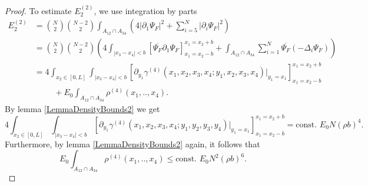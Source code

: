 \documentclass[a4paper,11pt]{article}
\newcommand{\abs}[1]{\left\lvert #1 \right\rvert}
\numberwithin{equation}{section}
\begin{document}
\begin{proof}
		To estimate $ E_2^{(2)} $, we use integration by parts\begin{equation}
		\begin{aligned}
		E_2^{(2)}&=\binom{N}{2}\binom{N-2}{2}\int_{A_{12}\cap A_{34}} \left(4\abs{\partial_1\Psi_F}^2+\sum_{i=5}^{N}\abs{\partial_i\Psi_F}^2\right)\\
		&=\binom{N}{2}\binom{N-2}{2}\left(4\int_{\abs{x_3-x_4}<b}\left[\overline{\Psi_F}\partial_1\Psi_F\right]_{x_1=x_2-b}^{x_1=x_2+b} +\int_{A_{12}\cap A_{34}} \sum_{i=1}^{N}\overline{\Psi_F}(-\Delta_i\Psi_F)\right)\\
		&=4\int_{x_2\in[0,L]}\int_{\abs{x_3-x_4}<b}\left[\partial_{y_1}\gamma^{(4)}(x_1,x_2,x_3,x_4;y_1,x_2,x_3,x_4)\bigg\vert_{y_1=x_1}\right]_{x_1=x_2-b}^{x_1=x_2+b}\\&\hspace{1cm}+E_0\int_{A_{12}\cap A_{34}}\rho^{(4)}(x_1,..,x_4).
		\end{aligned}
		\end{equation}
		By lemma \ref{LemmaDensityBounds2} we get \begin{equation}
		4\int_{x_2\in[0,L]}\int_{\abs{x_3-x_4}<b}\left[\partial_{y_1}\gamma^{(4)}(x_1,x_2,x_3,x_4;y_1,y_2,y_3,y_4)\bigg\vert_{y_1=x_1}\right]_{x_1=x_2-b}^{x_1=x_2+b}=\text{const. }E_0 N (\rho b)^4.
		\end{equation}
		Furthermore, by lemma \ref{LemmaDensityBounds2} again, it follows that \begin{equation}
		E_0\int_{A_{12}\cap A_{34}}\rho^{(4)}(x_1,..,x_4)\leq \text{const. } E_0 N^2(\rho b)^6.
		\end{equation}
	\end{proof}
		
\end{document}
